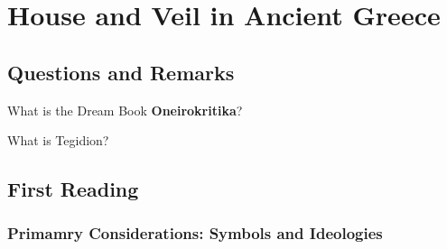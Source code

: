 %
%
%
\chapter{House and Veil in Ancient Greece}
\label{HouseVeil} %








\abstract{}

\section{Questions and Remarks}
\label{sec:QR9}

\begin{qst}
    What is the Dream Book \textbf{Oneirokritika}?
\end{qst}

\begin{qst}
    What is Tegidion?
\end{qst}


\section{First Reading}
\label{sec:FirRead9}


\subsection{Primamry Considerations: Symbols and Ideologies}

